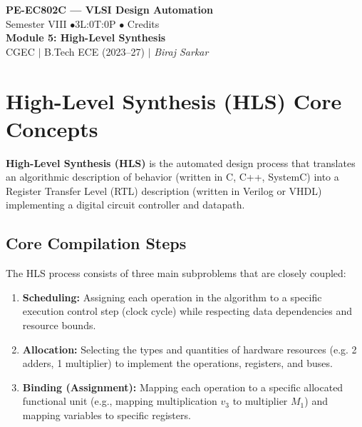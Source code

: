 \documentclass[12pt,a4paper]{article}
\begin{document}

\begin{center}
  {\LARGE\bfseries\color{myred} PE-EC802C --- VLSI Design Automation}\\[5pt]
  {\normalsize\color{mydark} Semester VIII \quad$\bullet$\quad 3L:0T:0P \quad$\bullet$ Credits}\\[3pt]
  {\normalsize\color{myteal}\textbf{Module 5: High-Level Synthesis}}\\[3pt]
  {\small\color{mydark} CGEC \;$|$\; B.Tech ECE (2023--27) \;$|$\; \textit{Biraj Sarkar}}
\end{center}
\vspace{2pt}
\noindent{\color{myred}\rule{\linewidth}{1.5pt}}
\vspace{2pt}

\hypersetup{linkcolor=mydark}
\tableofcontents
\hypersetup{linkcolor=myteal}
\newpage

\section{High-Level Synthesis (HLS) Core Concepts}

\begin{tcolorbox}[defbox, title={High-Level Synthesis}]
  \textbf{High-Level Synthesis (HLS)} is the automated design process that translates an algorithmic description of behavior (written in C, C++, SystemC) into a Register Transfer Level (RTL) description (written in Verilog or VHDL) implementing a digital circuit controller and datapath.
\end{tcolorbox}

\subsection{Core Compilation Steps}
The HLS process consists of three main subproblems that are closely coupled:
\begin{enumerate}[leftmargin=*, itemsep=2pt]
  \item \textbf{Scheduling:} Assigning each operation in the algorithm to a specific execution control step (clock cycle) while respecting data dependencies and resource bounds.
  \item \textbf{Allocation:} Selecting the types and quantities of hardware resources (e.g. 2 adders, 1 multiplier) to implement the operations, registers, and buses.
  \item \textbf{Binding (Assignment):} Mapping each operation to a specific allocated functional unit (e.g., mapping multiplication $v_3$ to multiplier $M_1$) and mapping variables to specific registers.
\end{enumerate}
\end{document}
